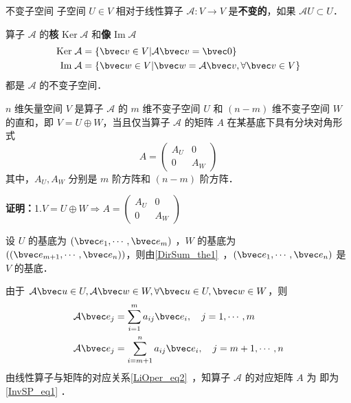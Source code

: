 
\begin{issues}
\issueTODO
\end{issues}

\begin{definition}{不变子空间}
子空间 $U\in V$ 相对于线性算子 $\mathcal{A}:V\rightarrow V$ 是\textbf{不变的}，如果 $\mathcal{A}U\subset U$．
\end{definition}
\begin{example}{}
算子 $\mathcal{A}$ 的\textbf{核} $\mathrm{Ker}\;\mathcal A$ 和\textbf{像} $\mathrm{Im}\;\mathcal{A}$
\begin{equation}
\begin{aligned}
\mathrm{Ker}\;\mathcal{A}&=\{\bvec v\in V|\mathcal{A}\bvec v=\bvec 0\}\\
\mathrm{Im}\;\mathcal{A}&=\{\bvec w\in V|\bvec w=\mathcal{A}\bvec v,\forall\bvec v\in V\}
\end{aligned}
\end{equation}
都是 $\mathcal A$ 的不变子空间．
\end{example}
\begin{theorem}{}
$n$ 维矢量空间 $V$ 是算子 $\mathcal{A}$ 的 $m$ 维不变子空间 $U$ 和 $(n-m)$ 维不变子空间 $W$ 的直和，即 $V=U\oplus W$，当且仅当算子 $\mathcal{A}$ 的矩阵 $A$ 在某基底下具有分块对角形式
\begin{equation}\label{InvSP_eq1}
A=\begin{pmatrix}
A_U&0\\
0&A_W
\end{pmatrix}
\end{equation}
其中，$A_U,A_W$ 分别是 $m$ 阶方阵和 $(n-m)$ 阶方阵．
\end{theorem}
\textbf{证明：}1.$
V=U\oplus W\Rightarrow A=\begin{pmatrix}
A_U&0\\
0&A_W
\end{pmatrix}
$

设 $U$ 的基底为 $(\bvec e_1,\cdots,\bvec e_m)$ ，$W$ 的基底为 $((\bvec e_{m+1},\cdots,\bvec e_n))$，则由\autoref{DirSum_the1}~，$(\bvec e_{1},\cdots,\bvec e_n)$ 是 $V$ 的基底．

由于 $\mathcal{A}\bvec u\in U, \mathcal{A}\bvec w\in W,\forall \bvec u\in U,\bvec w\in W$，则
\begin{equation}
\begin{aligned}
\mathcal{A}\bvec e_j&=\sum_{i=1}^m a_{ij}\bvec e_i,\quad j=1,\cdots ,m\\
\mathcal{A}\bvec e_j&=\sum_{i=m+1}^n a_{ij}\bvec e_i,\quad j=m+1,\cdots ,n
\end{aligned}
\end{equation}
由线性算子与矩阵的对应关系\autoref{LiOper_eq2}~，知算子 $\mathcal{A}$ 的对应矩阵 $A$ 为 即为\autoref{InvSP_eq1} ．